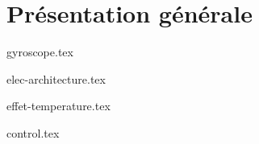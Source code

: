 \chapter{Présentation générale}
\label{sec:presentation-generale}

{gyroscope.tex}

\newpage
{elec-architecture.tex}

\newpage
{effet-temperature.tex}

\newpage
{control.tex}


